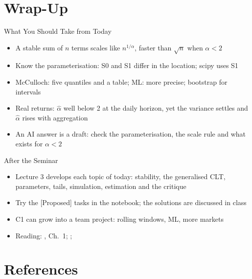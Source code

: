 \section{Wrap-Up}

\begin{frame}{What You Should Take from Today}
\itemsize{\small}
\begin{itemize}
    \item A stable sum of $n$ terms scales like $n^{1/\alpha}$, faster than $\sqrt{n}$ when $\alpha < 2$
    \item Know the parameterisation: S0 and S1 differ in the location; scipy uses S1
    \item McCulloch: five quantiles and a table; ML: more precise; bootstrap for intervals
    \item Real returns: $\hat\alpha$ well below 2 at the daily horizon, yet the variance settles and $\hat\alpha$ rises with aggregation
    \item An AI answer is a draft: check the parameterisation, the scale rule and what exists for $\alpha < 2$
\end{itemize}
\end{frame}

\begin{frame}{After the Seminar}
\itemsize{\small}
\begin{itemize}
    \item Lecture 3 develops each topic of today: stability, the generalised CLT, parameters, tails, simulation, estimation and the critique
    \item Try the [Proposed] tasks in the notebook; the solutions are discussed in class
    \item C1 can grow into a team project: rolling windows, ML, more markets
    \item Reading: , Ch.~1; ; 
\end{itemize}
\end{frame}


\section{References}

